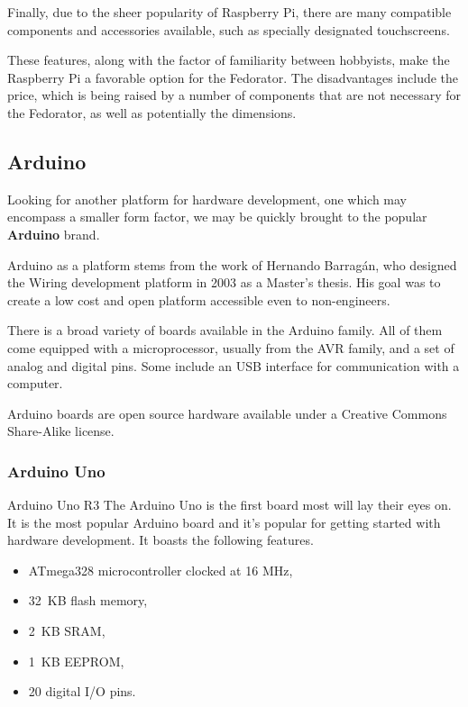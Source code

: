             Finally, due to the sheer popularity of Raspberry Pi, there are many compatible components and accessories available\cite{rpi-rs-components}\cite{rpi-the-pi-hut-store}, such as specially designated touchscreens\cite{rpi-official-touchscreen}.
            
            These features, along with the factor of familiarity between hobbyists, make the Raspberry Pi a favorable option for the Fedorator.  The disadvantages include the price, which is being raised by a number of components that are not necessary for the Fedorator, as well as potentially the dimensions.
        \subsection{Arduino}
            Looking for another platform for hardware development, one which may encompass a smaller form factor, we may be quickly brought to the popular \textbf{Arduino} brand.
            
            Arduino as a platform stems from the work of Hernando Barragán, who designed the Wiring development platform in 2003 as a Master's thesis.  His goal was to create a low cost and open platform accessible even to non-engineers\cite{arduino-untold-history}. 
            
            There is a broad variety of boards available in the Arduino family\cite{arduino-products}.  All of them come equipped with a microprocessor, usually from the AVR family, and a set of analog and digital pins.  Some include an USB interface for communication with a computer.
            
            Arduino boards are open source hardware available under a Creative Commons Share-Alike license\cite{arduino-faq-open-hw}.
            
            \subsubsection{Arduino Uno}
                    {Arduino Uno R3 \cite{arduino-wikimedia-uno}}
                The Arduino Uno is the first board most will lay their eyes on.  It is the most popular Arduino board and it's popular for getting started with hardware development\cite{arduino-uno}.  It boasts the following features.
                
                \begin{itemize}
                    \item ATmega328 microcontroller clocked at 16 MHz,
                    \item 32~KB flash memory,
                    \item 2~KB SRAM,
                    \item 1~KB EEPROM,
                    \item 20 digital I/O pins.
                \end{itemize}
                
